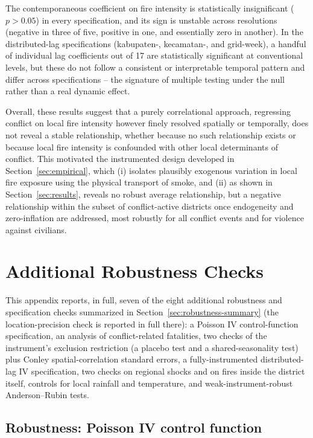 \documentclass[12pt]{article}
\begin{document}
The contemporaneous coefficient on fire intensity is statistically insignificant ($p > 0.05$) in every specification, and its sign is unstable across resolutions (negative in three of five, positive in one, and essentially zero in another). In the distributed-lag specifications (kabupaten-, kecamatan-, and grid-week), a handful of individual lag coefficients out of 17 are statistically significant at conventional levels, but these do not follow a consistent or interpretable temporal pattern and differ across specifications -- the signature of multiple testing under the null rather than a real dynamic effect.

Overall, these results suggest that a purely correlational approach, regressing conflict on local fire intensity however finely resolved spatially or temporally, does not reveal a stable relationship, whether because no such relationship exists or because local fire intensity is confounded with other local determinants of conflict. This motivated the instrumented design developed in Section~\ref{sec:empirical}, which (i) isolates plausibly exogenous variation in local fire exposure using the physical transport of smoke, and (ii) as shown in Section~\ref{sec:results}, reveals no robust average relationship, but a negative relationship within the subset of conflict-active districts once endogeneity and zero-inflation are addressed, most robustly for all conflict events and for violence against civilians.

\section{Additional Robustness Checks}
\label{sec:appendixrobustness}

This appendix reports, in full, seven of the eight additional robustness and specification checks summarized in Section~\ref{sec:robustness-summary} (the location-precision check is reported in full there): a Poisson IV control-function specification, an analysis of conflict-related fatalities, two checks of the instrument's exclusion restriction (a placebo test and a shared-seasonality test) plus Conley spatial-correlation standard errors, a fully-instrumented distributed-lag IV specification, two checks on regional shocks and on fires inside the district itself, controls for local rainfall and temperature, and weak-instrument-robust Anderson--Rubin tests.

\subsection{Robustness: Poisson IV control function}
\label{sec:poisson}
\end{document}
